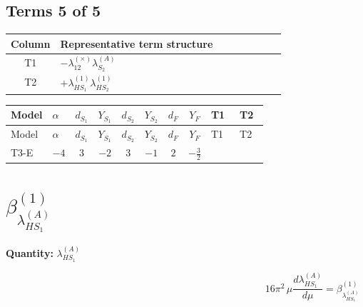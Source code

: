 \documentclass[8pt]{article}
\begin{document}
\begin{landscape}
\subsection*{Terms 5 of 5}
\begin{center}
\begin{tabular}{@{}c >{\raggedright\arraybackslash}p{0.82\linewidth}@{}}
\toprule
Column & Representative term structure \\
\midrule
T1 & \(\displaystyle -{\lambda_{12}^{(\times)}} {\lambda_{S_2}^{(A)}}\) \\
\midrule
T2 & \(\displaystyle +{\lambda_{HS_1}^{(1)}} {\lambda_{HS_2}^{(1)}}\) \\
\midrule
\bottomrule
\end{tabular}
\end{center}
\smallskip
\tiny
\begin{longtable}{@{}llcccccc >{\raggedright\arraybackslash}p{0.21\linewidth} >{\raggedright\arraybackslash}p{0.21\linewidth}@{}}
\toprule
Model & $\alpha$ & $d_{S_1}$ & $Y_{S_1}$ & $d_{S_2}$ & $Y_{S_2}$ & $d_F$ & $Y_F$ & T1 & T2 \\
\midrule
\endfirsthead
\toprule
Model & $\alpha$ & $d_{S_1}$ & $Y_{S_1}$ & $d_{S_2}$ & $Y_{S_2}$ & $d_F$ & $Y_F$ & T1 & T2 \\
\midrule
\endhead
T3-E & $-4$ & $3$ & $-2$ & $3$ & $-1$ & $2$ & $-\frac{3}{2}$ & \scriptsize\adjustbox{max width=\linewidth}{$\begin{gathered} -{\lambda_{12}^{(\times)}} {\lambda_{S_2}^{(A)}}\end{gathered}$} & \scriptsize\adjustbox{max width=\linewidth}{$\begin{gathered} +{\lambda_{HS_1}^{(1)}} {\lambda_{HS_2}^{(1)}}\end{gathered}$} \\
\midrule
\bottomrule
\end{longtable}
\clearpage
\section*{$\beta_{\lambda_{HS_1}^{(A)}}^{(1)}$}
\noindent\textbf{Quantity: }$\lambda_{HS_1}^{(A)}$\par\smallskip
\[16\pi^2\,\mu\frac{d \lambda_{HS_1}^{(A)}}{d\mu}=\beta_{\lambda_{HS_1}^{(A)}}^{(1)}\]

\end{landscape}
\end{document}
